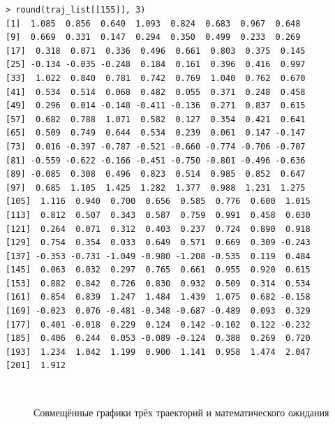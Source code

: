 \documentclass[14pt,a4paper]{scrartcl}
\begin{document}
	
\begin{verbatim}
> round(traj_list[[155]], 3)
[1]  1.085  0.856  0.640  1.093  0.824  0.683  0.967  0.648
[9]  0.669  0.331  0.147  0.294  0.350  0.499  0.233  0.269
[17]  0.318  0.071  0.336  0.496  0.661  0.803  0.375  0.145
[25] -0.134 -0.035 -0.248  0.184  0.161  0.396  0.416  0.997
[33]  1.022  0.840  0.781  0.742  0.769  1.040  0.762  0.670
[41]  0.534  0.514  0.068  0.482  0.055  0.371  0.248  0.458
[49]  0.296  0.014 -0.148 -0.411 -0.136  0.271  0.837  0.615
[57]  0.682  0.788  1.071  0.582  0.127  0.354  0.421  0.641
[65]  0.509  0.749  0.644  0.534  0.239  0.061  0.147 -0.147
[73]  0.016 -0.397 -0.787 -0.521 -0.660 -0.774 -0.706 -0.707
[81] -0.559 -0.622 -0.166 -0.451 -0.750 -0.801 -0.496 -0.636
[89] -0.085  0.308  0.496  0.823  0.514  0.985  0.852  0.647
[97]  0.685  1.105  1.425  1.282  1.377  0.988  1.231  1.275
[105]  1.116  0.940  0.700  0.656  0.585  0.776  0.600  1.015
[113]  0.812  0.507  0.343  0.587  0.759  0.991  0.458  0.030
[121]  0.264  0.071  0.312  0.403  0.237  0.724  0.890  0.918
[129]  0.754  0.354  0.033  0.649  0.571  0.669  0.309 -0.243
[137] -0.353 -0.731 -1.049 -0.980 -1.208 -0.535  0.119  0.484
[145]  0.063  0.032  0.297  0.765  0.661  0.955  0.920  0.615
[153]  0.882  0.842  0.726  0.830  0.932  0.509  0.314  0.534
[161]  0.854  0.839  1.247  1.484  1.439  1.075  0.682 -0.158
[169] -0.023  0.076 -0.481 -0.348 -0.687 -0.489  0.093  0.329
[177]  0.401 -0.018  0.229  0.124  0.142 -0.102  0.122 -0.232
[185]  0.406  0.244  0.053 -0.089 -0.124  0.388  0.269  0.720
[193]  1.234  1.042  1.199  0.900  1.141  0.958  1.474  2.047
[201]  1.912
\end{verbatim}
\begin{tcolorbox}[colback=red!5!white,colframe=red!75!black]
	\begin{figure}[H]
		\begin{minipage}[h]{1\linewidth}
			  \\
			\caption*{Совмещённые графики трёх траекторий и математического ожидания}
		\end{minipage}
	\end{figure}
\end{tcolorbox}
\end{document}
